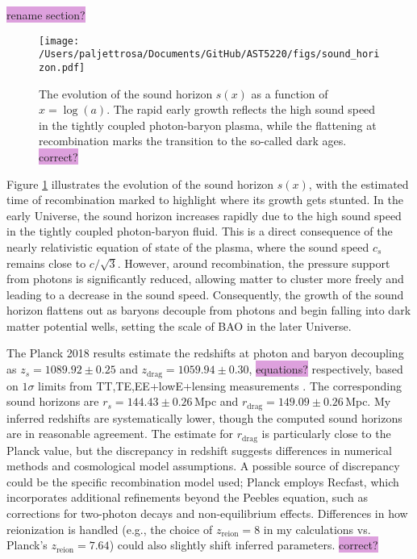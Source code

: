 \documentclass{aa}
\numberwithin{equation}{section}
\numberwithin{table}{section}
\numberwithin{figure}{section}
\begin{document}
\colorbox{Plum}{rename section?}


\begin{figure}
  \centering
  \texttt{[image: /Users/paljettrosa/Documents/GitHub/AST5220/figs/sound\_horizon.pdf]}
  \caption{The evolution of the sound horizon $s(x)$ as a function of $x = \log(a)$. The rapid early growth reflects the high sound speed in the tightly coupled photon-baryon plasma, while the flattening at recombination marks the transition to the so-called dark ages. \colorbox{Plum}{correct?}}\label{fig:sound horizon}
\end{figure}

Figure \ref{fig:sound horizon} illustrates the evolution of the sound horizon $s(x)$, with the estimated time of recombination marked to highlight where its growth gets stunted. In the early Universe, the sound horizon increases rapidly due to the high sound speed in the tightly coupled photon-baryon fluid. This is a direct consequence of the nearly relativistic equation of state of the plasma, where the sound speed $c_s$ remains close to $c/\sqrt{3}$. However, around recombination, the pressure support from photons is significantly reduced, allowing matter to cluster more freely and leading to a decrease in the sound speed. Consequently, the growth of the sound horizon flattens out as baryons decouple from photons and begin falling into dark matter potential wells, setting the scale of BAO in the later Universe.

The Planck 2018 results estimate the redshifts at photon and baryon decoupling as $z_s = 1089.92\pm0.25$ and $z_\text{drag} = 1059.94\pm0.30$, \colorbox{Plum}{equations?} respectively, based on $1\sigma$ limits from TT,TE,EE+lowE+lensing measurements \citep[see][]{Planck}. The corresponding sound horizons are $r_s = 144.43\pm0.26\,$Mpc and $r_\text{drag} = 149.09\pm0.26\,$Mpc. My inferred redshifts are systematically lower, though the computed sound horizons are in reasonable agreement. The estimate for $r_\text{drag}$ is particularly close to the Planck value, but the discrepancy in redshift suggests differences in numerical methods and cosmological model assumptions. A possible source of discrepancy could be the specific recombination model used; Planck employs Recfast, which incorporates additional refinements beyond the Peebles equation, such as corrections for two-photon decays and non-equilibrium effects. Differences in how reionization is handled (e.g., the choice of $z_\text{reion} = 8$ in my calculations vs. Planck's $z_\text{reion} = 7.64$) could also slightly shift inferred parameters. \colorbox{Plum}{correct?}
\end{document}
